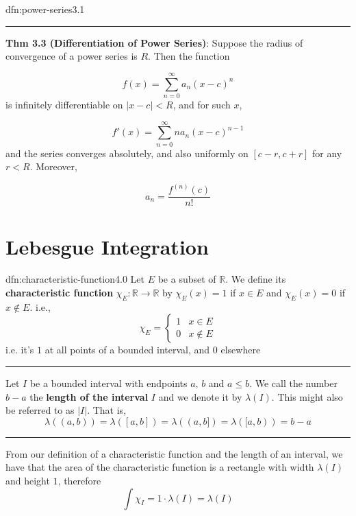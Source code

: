 \documentclass[landscape, 8pt]{extarticle}
\begin{document}
\begin{multicols}{3}
\begin{dfn}{dfn:power-series}{3.1}
	\vspace{-5pt}
	\noindent\rule{\textwidth}{0.2pt}
	\textbf{Thm 3.3 (Differentiation of Power Series)}: Suppose the radius of convergence of a power series is $R$. Then the function

	\vspace{-8pt}
	\[f(x)=\sum_{n=0}^{\infty} a_{n}(x-c)^{n}\]
	is infinitely differentiable on $\lvert x-c \rvert<R$, and for such $x$,
	\vspace{-8pt}

	\[f'(x)=\sum_{n=0}^{\infty} na_{n}(x-c)^{n-1}\]
	and the series converges absolutely, and also uniformly on $[c-r,c+r]$ for any $r<R$. Moreover,

	\vspace{-5pt}
	\[a_{n}=\frac{f^{(n)}(c)}{n!}\]
\end{dfn}



\vspace{-15pt}
\section{Lebesgue Integration}

\vspace{-5pt}
\begin{dfn}{dfn:characteristic-function}{4.0}
	\vspace{-5pt}
	Let $E$ be a subset of $\mathbb{R}$. We define its \textbf{characteristic function} $\chi_{E}:\mathbb{R}\to\mathbb{R}$ by $\chi_{E}(x)=1$ if $x\in E$ and $\chi_{E}(x)=0$ if $x\not\in E$. i.e.,
	\[\chi_{E}=\begin{cases}
	1&x\in E \\
	0 & x\not\in E
	\end{cases}\]
	i.e. it's $1$ at all points of a bounded interval, and $0$ elsewhere

	\vspace{-5pt}
	\noindent\rule{\textwidth}{0.2pt}
	
	Let $I$ be a bounded interval with endpoints $a,\,b$ and $a\le b$. We call the number $b-a$ the \textbf{length of the interval} $I$ and we denote it by $\lambda(I)$. This might also be referred to as $\lvert I \rvert$. That is,
	\[\lambda((a,b)) = \lambda([a,b]) = \lambda((a,b]) = \lambda([a,b)) = b-a\]

	\vspace{-5pt}
	\noindent\rule{\textwidth}{0.2pt}
	From our definition of a characteristic function and the length of an interval, we have that the area of the characteristic function is a rectangle with width $\lambda(I)$ and height $1$, therefore
	\vspace{-3pt}
	\[\int \chi_{I} = 1 \cdot \lambda(I) = \lambda(I)\]
\end{dfn}


\end{multicols}
\end{document}
